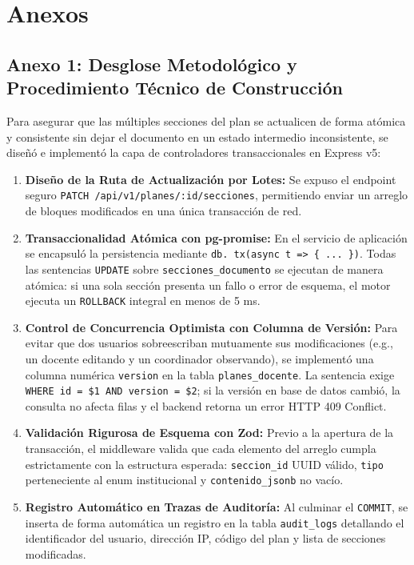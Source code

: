 \documentclass[12pt,a4paper]{article}
\begin{document}
\vspace{0.4cm}

\section{Anexos}

\subsection*{Anexo 1: Desglose Metodológico y Procedimiento Técnico de Construcción}
Para asegurar que las múltiples secciones del plan se actualicen de forma atómica y consistente sin dejar el documento en un estado intermedio inconsistente, se diseñó e implementó la capa de controladores transaccionales en Express v5:

\begin{enumerate}[leftmargin=1.5em, itemsep=3pt]
    \item \textbf{Diseño de la Ruta de Actualización por Lotes:} Se expuso el endpoint seguro \texttt{PATCH /\allowbreak  api/\allowbreak  v1/\allowbreak  }\allowbreak\texttt{planes/\allowbreak  :id/\allowbreak  }\allowbreak\texttt{secciones}, permitiendo enviar un arreglo de bloques modificados en una única transacción de red.
    \item \textbf{Transaccionalidad Atómica con pg-promise:} En el servicio de aplicación se encapsuló la persistencia mediante \texttt{db. tx(async t => \{ ... \})}. Todas las sentencias \texttt{UPDATE} sobre \texttt{secciones\_\allowbreak  documento} se ejecutan de manera atómica: si una sola sección presenta un fallo o error de esquema, el motor ejecuta un \texttt{ROLLBACK} integral en menos de 5 ms.
    \item \textbf{Control de Concurrencia Optimista con Columna de Versión:} Para evitar que dos usuarios sobreescriban mutuamente sus modificaciones (e.g., un docente editando y un coordinador observando), se implementó una columna numérica \texttt{version} en la tabla \texttt{planes\_\allowbreak  docente}. La sentencia exige \texttt{WHERE id = \$1 AND version = \$2}; si la versión en base de datos cambió, la consulta no afecta filas y el backend retorna un error HTTP 409 Conflict.
    \item \textbf{Validación Rigurosa de Esquema con Zod:} Previo a la apertura de la transacción, el middleware valida que cada elemento del arreglo cumpla estrictamente con la estructura esperada: \texttt{seccion\_\allowbreak  id} UUID válido, \texttt{tipo} perteneciente al enum institucional y \texttt{contenido\_\allowbreak  jsonb} no vacío.
    \item \textbf{Registro Automático en Trazas de Auditoría:} Al culminar el \texttt{COMMIT}, se inserta de forma automática un registro en la tabla \texttt{audit\_\allowbreak  logs} detallando el identificador del usuario, dirección IP, código del plan y lista de secciones modificadas.
\end{enumerate}
\end{document}
